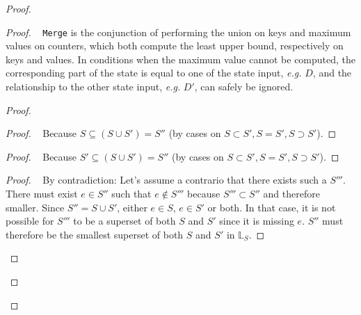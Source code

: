 \documentclass[10pt, oneside]{article}   	%
\begin{document}
\begin{proof}
	\begin{proof}
		\pfsketch~ \texttt{Merge} is the conjunction of performing the union on keys and maximum values on counters, which both compute the least upper bound, respectively on keys and values. In conditions when the maximum value cannot be computed, the corresponding part of the state is equal to one of the state input, \textit{e.g.} $D$, and the relationship to the other state input, \textit{e.g.} $D'$, can safely be ignored.
		\begin{proof}
			\begin{proof}
				\pf~ Because $S \subseteq (S \cup S') = S''$ (by cases on $S \subset S', S=S', S \supset S'$).
			\end{proof}
			
			\begin{proof}
				\pf~ Because $S' \subseteq (S \cup S') = S''$ (by cases on $S \subset S', S=S', S \supset S'$).
			\end{proof}
			
			\begin{proof}
				\pf~ By contradiction: Let's assume a contrario that there exists such a $S'''$. There must exist $e \in S''$ such that $e \notin S'''$ because $S''' \subset S''$ and therefore smaller. Since $S'' = S \cup S'$, either $e \in S$, $e \in S'$ or both. In that case, it is not possible for $S'''$ to be a superset of both $S$ and $S'$ since it is missing $e$. $S''$ must therefore be the smallest superset of both $S$ and $S'$ in $\mathds{L}_S$.
			\end{proof}


\end{proof}
\end{proof}
\end{proof}
\end{document}
